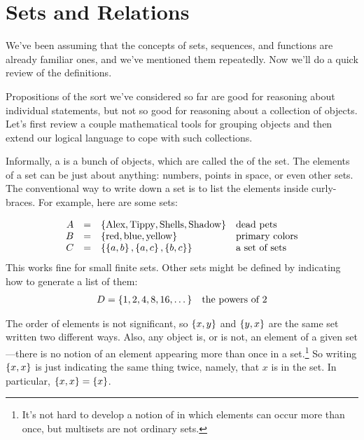 \chapter{Sets and Relations}\label{sets_chap}

\begin{editingnotes}
We've been assuming that the concepts of sets, sequences, and functions are
already familiar ones, and we've mentioned them repeatedly.  Now we'll do a
quick review of the definitions.
\end{editingnotes}

Propositions of the sort we've considered so far are good for
reasoning about individual statements, but not so good for reasoning
about a collection of objects.  Let's first review a couple
mathematical tools for grouping objects and then extend our logical
language to cope with such collections.

Informally, a  is a bunch of objects, which are called the
 of the set.  The elements of a set can be just about
anything: numbers, points in space, or even other sets.  The conventional
way to write down a set is to list the elements inside curly-braces.  For
example, here are some sets:

\[
\begin{array}{rcll}
A & = & \left\{\text{Alex}, \text{Tippy}, \text{Shells}, \text{Shadow}\right\} & \text{dead pets} \\
B & = & \left\{\text{red}, \text{blue}, \text{yellow}\right\} & \text{primary colors} \\
C & = & \left\{ \left\{a, b\right\}, \left\{a, c\right\}, \left\{b, c\right\}\right\} & \text{a set of sets}
\end{array}
\]
This works fine for small finite sets.  Other sets might be defined by
indicating how to generate a list of them:
\begin{align*}
D & =  \left\{1,2,4,8,16,\dots\right\} & \text{the powers of 2}
\end{align*}

The order of elements is not significant, so $\left\{x, y\right\}$ and $\left\{y, x\right\}$
are the same set written two different ways.  Also, any object is, or is
not, an element of a given set ---there is no notion of an element
appearing more than once in a set.\footnote{It's not hard to develop a
notion of  in which elements can occur more than once, but
multisets are not ordinary sets.}  So writing $\left\{x,x\right\}$ is just
indicating the same thing twice, namely, that $x$ is in the set.  In
particular, $\left\{x,x\right\} = \left\{x\right\}$.


